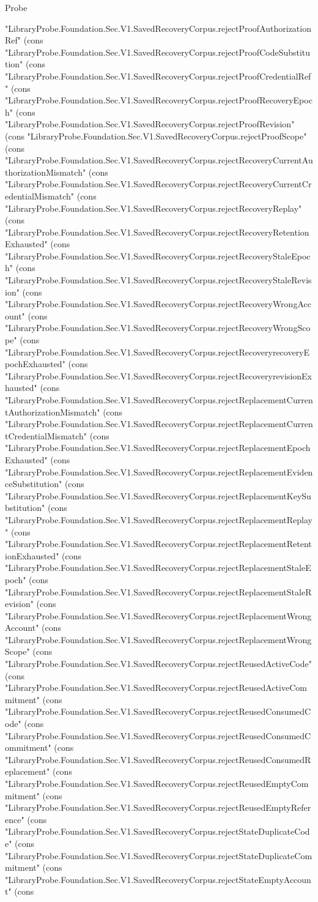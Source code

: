 \begin{lexlean}{Probe}
\begin{semanticmodule}
{"LibraryProbe.Foundation.Sec.V1.SavedRecoveryCorpus.rejectProofAuthorizationRef" (cons "LibraryProbe.Foundation.Sec.V1.SavedRecoveryCorpus.rejectProofCodeSubstitution" (cons "LibraryProbe.Foundation.Sec.V1.SavedRecoveryCorpus.rejectProofCredentialRef" (cons "LibraryProbe.Foundation.Sec.V1.SavedRecoveryCorpus.rejectProofRecoveryEpoch" (cons "LibraryProbe.Foundation.Sec.V1.SavedRecoveryCorpus.rejectProofRevision" (cons "LibraryProbe.Foundation.Sec.V1.SavedRecoveryCorpus.rejectProofScope" (cons "LibraryProbe.Foundation.Sec.V1.SavedRecoveryCorpus.rejectRecoveryCurrentAuthorizationMismatch" (cons "LibraryProbe.Foundation.Sec.V1.SavedRecoveryCorpus.rejectRecoveryCurrentCredentialMismatch" (cons "LibraryProbe.Foundation.Sec.V1.SavedRecoveryCorpus.rejectRecoveryReplay" (cons "LibraryProbe.Foundation.Sec.V1.SavedRecoveryCorpus.rejectRecoveryRetentionExhausted" (cons "LibraryProbe.Foundation.Sec.V1.SavedRecoveryCorpus.rejectRecoveryStaleEpoch" (cons "LibraryProbe.Foundation.Sec.V1.SavedRecoveryCorpus.rejectRecoveryStaleRevision" (cons "LibraryProbe.Foundation.Sec.V1.SavedRecoveryCorpus.rejectRecoveryWrongAccount" (cons "LibraryProbe.Foundation.Sec.V1.SavedRecoveryCorpus.rejectRecoveryWrongScope" (cons "LibraryProbe.Foundation.Sec.V1.SavedRecoveryCorpus.rejectRecoveryrecoveryEpochExhausted" (cons "LibraryProbe.Foundation.Sec.V1.SavedRecoveryCorpus.rejectRecoveryrevisionExhausted" (cons "LibraryProbe.Foundation.Sec.V1.SavedRecoveryCorpus.rejectReplacementCurrentAuthorizationMismatch" (cons "LibraryProbe.Foundation.Sec.V1.SavedRecoveryCorpus.rejectReplacementCurrentCredentialMismatch" (cons "LibraryProbe.Foundation.Sec.V1.SavedRecoveryCorpus.rejectReplacementEpochExhausted" (cons "LibraryProbe.Foundation.Sec.V1.SavedRecoveryCorpus.rejectReplacementEvidenceSubstitution" (cons "LibraryProbe.Foundation.Sec.V1.SavedRecoveryCorpus.rejectReplacementKeySubstitution" (cons "LibraryProbe.Foundation.Sec.V1.SavedRecoveryCorpus.rejectReplacementReplay" (cons "LibraryProbe.Foundation.Sec.V1.SavedRecoveryCorpus.rejectReplacementRetentionExhausted" (cons "LibraryProbe.Foundation.Sec.V1.SavedRecoveryCorpus.rejectReplacementStaleEpoch" (cons "LibraryProbe.Foundation.Sec.V1.SavedRecoveryCorpus.rejectReplacementStaleRevision" (cons "LibraryProbe.Foundation.Sec.V1.SavedRecoveryCorpus.rejectReplacementWrongAccount" (cons "LibraryProbe.Foundation.Sec.V1.SavedRecoveryCorpus.rejectReplacementWrongScope" (cons "LibraryProbe.Foundation.Sec.V1.SavedRecoveryCorpus.rejectReusedActiveCode" (cons "LibraryProbe.Foundation.Sec.V1.SavedRecoveryCorpus.rejectReusedActiveCommitment" (cons "LibraryProbe.Foundation.Sec.V1.SavedRecoveryCorpus.rejectReusedConsumedCode" (cons "LibraryProbe.Foundation.Sec.V1.SavedRecoveryCorpus.rejectReusedConsumedCommitment" (cons "LibraryProbe.Foundation.Sec.V1.SavedRecoveryCorpus.rejectReusedConsumedReplacement" (cons "LibraryProbe.Foundation.Sec.V1.SavedRecoveryCorpus.rejectReusedEmptyCommitment" (cons "LibraryProbe.Foundation.Sec.V1.SavedRecoveryCorpus.rejectReusedEmptyReference" (cons "LibraryProbe.Foundation.Sec.V1.SavedRecoveryCorpus.rejectStateDuplicateCode" (cons "LibraryProbe.Foundation.Sec.V1.SavedRecoveryCorpus.rejectStateDuplicateCommitment" (cons "LibraryProbe.Foundation.Sec.V1.SavedRecoveryCorpus.rejectStateEmptyAccount" (cons }
\end{semanticmodule}
\end{lexlean}

